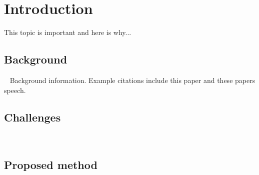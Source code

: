 

\chapter{Introduction}

This topic is important and here is why...

\section{Background}~ Background information. Example citations include this paper\cite{miller2014broadband} and these papers speech\cite{wilson1999spike, scheuer2004data, furbass2015prospective}.


\section{Challenges}~ 

\section{Proposed method}~ 

\clearpage



